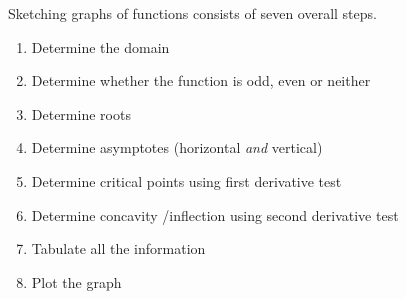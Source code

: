 Sketching graphs of functions consists of seven overall steps.
\begin{enumerate}
  \item Determine the domain
  \item Determine whether the function is odd, even or neither
  \item Determine roots
  \item Determine asymptotes (horizontal \emph{and} vertical)
  \item Determine critical points using first derivative test
  \item Determine concavity /inflection using second derivative test
  \item Tabulate all the information
  \item Plot the graph
\end{enumerate}


